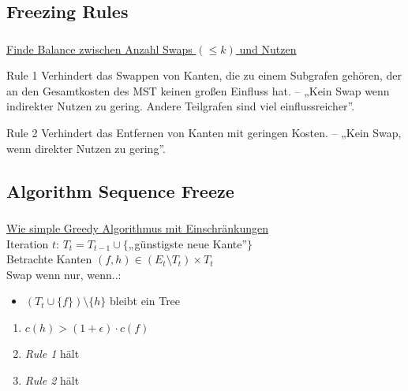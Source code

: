 \subsection{Freezing Rules}
\begin{frame}
    \frametitle{\insertsubsection}
    \underline{Finde Balance zwischen Anzahl Swaps $(\leq k)$ und Nutzen}\\
    \vspace{1em}
    \begin{block}{Rule 1}
        Verhindert das Swappen von Kanten, die zu einem Subgrafen gehören, der an den Gesamtkosten des MST keinen großen Einfluss hat. -- „Kein Swap wenn indirekter Nutzen zu gering. Andere Teilgrafen sind viel einflussreicher”.
    \end{block}
    \vspace{1em}
    \begin{block}{Rule 2}
        Verhindert das Entfernen von Kanten mit geringen Kosten. -- „Kein Swap, wenn direkter Nutzen zu gering”.
    \end{block}
\end{frame}

\subsection{Algorithm Sequence Freeze}
\begin{frame}
    \frametitle{\insertsubsection}
    \underline{Wie simple Greedy Algorithmus mit Einschränkungen}\\
    \vspace{1em}
    Iteration $t$: $T_t = T_{t-1} \cup \{$„günstigste neue Kante”$\}$\\
    \vspace{1em}
    Betrachte Kanten $(f, h) \in (E_t \setminus T_t) \times T_t$\\
    Swap wenn nur, wenn..:
    \vspace{1em}
    \begin{itemize}
        \itemsep\setlength{1em}
        \item $(T_t \cup \{f\}) \setminus \{h\}$ bleibt ein Tree
    \end{itemize}
    \begin{enumerate}
        \itemsep\setlength{1em}
        \item $c(h) > (1+\epsilon) \cdot c(f)$
        \item \emph{Rule 1} hält
        \item \emph{Rule 2} hält
    \end{enumerate}
\end{frame}

